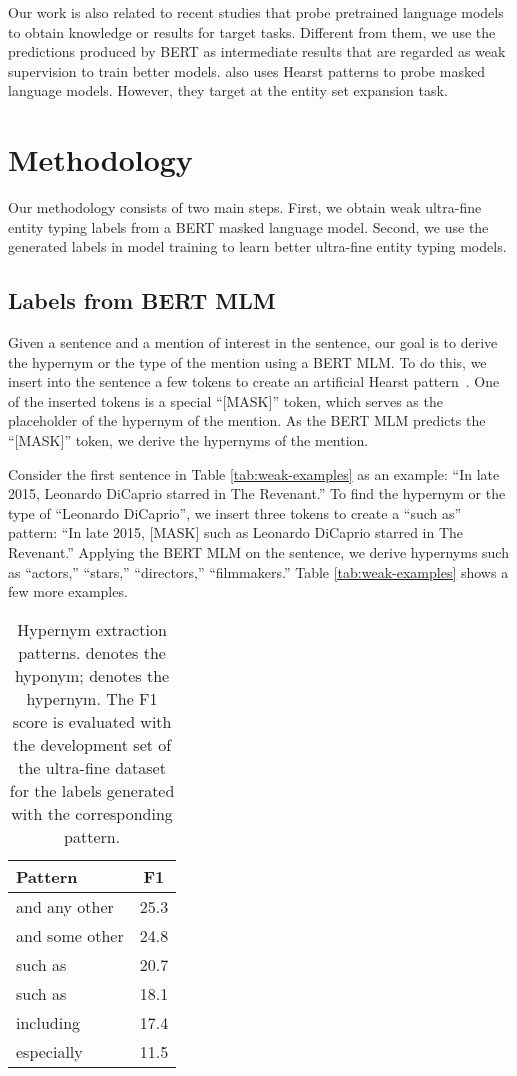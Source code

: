 \documentclass[11pt,a4paper]{article}
\begin{document}
Our work is also related to recent studies \cite{petroni2019language,jiang2020can,zhang2020empower} that probe pretrained language models to obtain knowledge or results for target tasks. Different from them, we use the predictions produced by BERT as intermediate results that are regarded as weak supervision to train better models. \cite{zhang2020empower} also uses Hearst patterns to probe masked language models. However, they target at the entity set expansion task.

\section{Methodology}
\label{sec:method}
Our methodology consists of two main steps. First, we obtain weak ultra-fine entity typing labels from a BERT masked language model. Second, we use the generated labels in model training to learn better ultra-fine entity typing models. 


\subsection{Labels from BERT MLM}
\label{sec:bert-mlm-labels}



Given a sentence and a mention of interest in the sentence, our goal is to derive the hypernym or the type of the mention using a BERT MLM. To do this, we insert into the sentence a few tokens to create an artificial Hearst pattern~\cite{hearst1992automatic}. One of the inserted tokens is a special ``[MASK]'' token, which serves as the placeholder of the hypernym of the mention. As the BERT MLM predicts the ``[MASK]'' token, we derive the hypernyms of the mention.

Consider the first sentence in Table \ref{tab:weak-examples} as an example: ``In late 2015, Leonardo DiCaprio starred in The Revenant.'' To find the hypernym or the type of ``Leonardo DiCaprio'', we insert three tokens to create a ``such as'' pattern: ``In late 2015, [MASK] such as Leonardo DiCaprio starred in The Revenant.'' Applying the BERT MLM on the sentence, we derive hypernyms such as ``actors,'' ``stars,'' ``directors,'' ``filmmakers.'' Table \ref{tab:weak-examples} shows a few more examples.

\begin{table}
\centering
\begin{tabular}{lc}
\hline \textbf{Pattern} & \textbf{F1} \\ \hline
 and any other  & 25.3 \\
 and some other  & 24.8 \\
 such as  & 20.7 \\
such  as  & 18.1 \\
 including  & 17.4 \\
 especially  & 11.5 \\
\hline
\end{tabular}
\caption{\label{tab:patterns} Hypernym extraction patterns.  denotes the hyponym;  denotes the hypernym. The F1 score is evaluated with the development set of the ultra-fine dataset \cite{choi2018ultra} for the labels generated with the corresponding pattern.}
\end{table}
\end{document}
